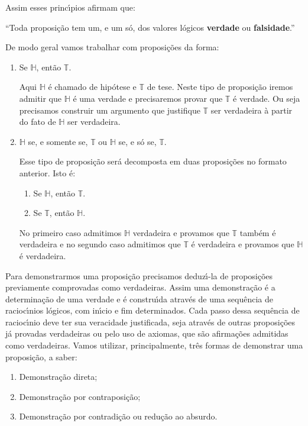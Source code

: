 Assim esses princ{\'\i}pios afirmam que:
\begin{center}
    ``Toda proposi\c{c}\~ao tem um, e um s\'o, dos valores l\'ogicos \textbf{verdade} ou \textbf{falsidade}.''
\end{center}

De modo geral vamos trabalhar com proposi\c{c}\~oes da forma:
\begin{enumerate}[label={\roman*})]
    \item Se $\mathbb{H}$, ent\~ao $\mathbb{T}$.

    Aqui $\mathbb{H}$ \'e chamado de hip\'otese e $\mathbb{T}$ de tese. Neste tipo de proposi\c{c}\~ao iremos admitir que $\mathbb{H}$ \'e uma verdade e precisaremos provar que $\mathbb{T}$ \'e verdade. Ou seja precisamos construir um argumento que justifique $\mathbb{T}$ ser verdadeira \`a partir do fato de $\mathbb{H}$ ser verdadeira.

    \item $\mathbb{H}$ se, e somente se, $\mathbb{T}$ ou $\mathbb{H}$ se, e s\'o se, $\mathbb{T}$.

    Esse tipo de proposi\c{c}\~ao ser\'a decomposta em duas proposi\c{c}\~oes no formato anterior. Isto \'e:
    \begin{enumerate}[label={\alph*})]
        \item Se $\mathbb{H}$, ent\~ao $\mathbb{T}$.
        \item Se $\mathbb{T}$, ent\~ao $\mathbb{H}$.
    \end{enumerate}

    No primeiro caso admitimos $\mathbb{H}$ verdadeira e provamos que $\mathbb{T}$ tamb\'em \'e verdadeira e no segundo caso admitimos que $\mathbb{T}$ \'e verdadeira e provamos que $\mathbb{H}$ \'e verdadeira.
\end{enumerate}

Para demonstrarmos uma proposi\c{c}\~ao precisamos deduz{\'\i}-la de proposi\c{c}\~oes previamente comprovadas como verdadeiras. Assim uma demonstra\c{c}\~ao \'e a determina\c{c}\~ao de uma verdade e \'e constru{\'\i}da atrav\'es de uma sequ\^encia de racioc{\'\i}nios l\'ogicos, com in{\'\i}cio e fim determinados. Cada passo dessa sequ\^encia de racioc{\'\i}nio deve ter sua veracidade justificada, seja atrav\'es de outras proposi\c{c}\~oes j\'a provadas verdadeiras ou pelo uso de axiomas, que s\~ao afirma\c{c}\~oes admitidas como verdadeiras. Vamos utilizar, principalmente, tr\^es formas de demonstrar uma proposi\c{c}\~ao, a saber:
\begin{enumerate}[label={\roman*})]
    \item Demonstra\c{c}\~ao direta;
    \item Demonstra\c{c}\~ao por contraposi\c{c}\~ao;
    \item Demonstra\c{c}\~ao por contradi\c{c}\~ao ou redu\c{c}\~ao ao absurdo.
\end{enumerate}


